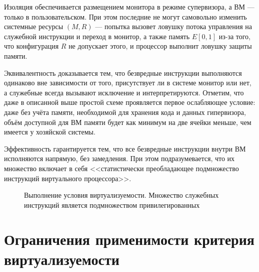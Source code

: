 \begin{itemize*}
    \item Изоляция обеспечивается размещением монитора в режиме супервизора, а ВМ --- только в пользовательском. При этом последние не могут самовольно изменить системные ресурсы $(M,R)$ --- попытка вызовет ловушку потока управления на служебной инструкции и переход в монитор, а также память $E[0,1]$ из-за того, что конфигурация $R$ не допускает этого, и процессор выполнит ловушку защиты памяти.
    \item Эквивалентность доказывается тем, что безвредные инструкции выполняются одинаково вне зависимости от того, присутствует ли в системе монитор или нет, а служебные всегда вызывают исключение и интерпретируются. Отметим, что даже в описанной выше простой схеме проявляется первое ослабляющее условие: даже без учёта памяти, необходимой для хранения кода и данных гипервизора, объём доступной для ВМ памяти будет как минимум на две ячейки меньше, чем имеется у хозяйской системы.
    \item Эффективность гарантируется тем, что все безвредные инструкции внутри ВМ исполняются напрямую, без замедления. При этом подразумевается, что их множество включает в себя <<статистически преобладающее подмножество инструкций виртуального процессора>>.
\end{itemize*}

\begin{figure}[htb]
    \centering
    \caption[Выполнение условия виртуализуемости]{Выполнение условия виртуализуемости. Множество служебных инструкций является подмножеством привилегированных}
    \label{fig:vm-sufficient-condition}
\end{figure}

\section{Ограничения применимости критерия виртуализуемости}\label{sec:revising-efficiency}

